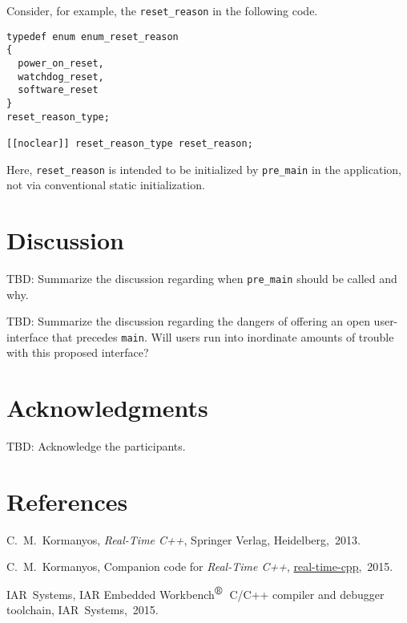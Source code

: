 \documentclass[11pt]{article}
\def\trademarksymbolr   {$^{\mbox{\textregistered}}$}
\begin{document}
Consider, for example, the \lstinline{reset_reason} in
the following code.

\begin{lstlisting}
typedef enum enum_reset_reason
{
  power_on_reset,
  watchdog_reset,
  software_reset
}
reset_reason_type;

[[noclear]] reset_reason_type reset_reason;
\end{lstlisting}

\noindent
Here, \lstinline{reset_reason} is intended to be initialized by
\lstinline{pre_main} in the application, not via conventional
static initialization.

\section{Discussion}

TBD: Summarize the discussion regarding when \lstinline{pre_main}
should be called and why.

TBD: Summarize the discussion regarding the dangers of
offering an open user-interface that precedes \lstinline{main}.
Will users run into inordinate amounts of trouble with this
proposed interface?

\section{Acknowledgments}

TBD: Acknowledge the participants.

\section{References}
\renewcommand{\section}[2]{}%
\begin{thebibliography}{9}


C.~M.~Kormanyos, {\em Real-Time C++},
Springer Verlag, Heidelberg,~2013.

C.~M.~Kormanyos, Companion code for {\em Real-Time C++},
{\href{https://github.com/ckormanyos/real-time-cpp}{real-time-cpp}},~2015.

IAR~Systems, IAR Embedded Workbench\trademarksymbolr\
C/C++ compiler and debugger toolchain,
IAR~Systems,~2015.


\end{thebibliography}
\end{document}
